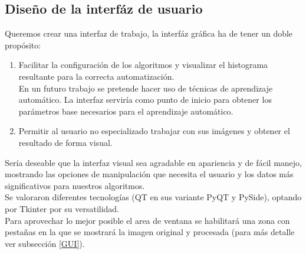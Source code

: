 	\subsection{Diseño de la interfáz de usuario}
	Queremos crear una interfaz de trabajo, la interfáz gráfica ha de tener un doble propósito:
	\begin{enumerate}
		\item Facilitar la configuración de los algoritmos y visualizar el histograma resultante para la correcta automatización.\\ En un futuro trabajo se pretende hacer uso de técnicas de aprendizaje automático. La interfaz serviría como punto de inicio para obtener los parámetros base necesarios para el aprendizaje automático.
		\item Permitir al usuario no especializado trabajar con sus imágenes y obtener el resultado de forma visual.
	\end{enumerate}
	Sería deseable que la interfaz visual sea agradable en apariencia y de fácil manejo, mostrando  las opciones de manipulación que necesita el usuario y los datos más significativos para  nuestros algoritmos.\\
	Se valoraron diferentes tecnologías (QT en sus variante PyQT y PySide), optando por Tkinter por su versatilidad.\\
	Para aprovechar lo mejor posible el area de ventana se habilitará una zona con pestañas en la que se mostrará la imagen original y procesada (para más detalle ver subsección \ref{GUI}).
	
